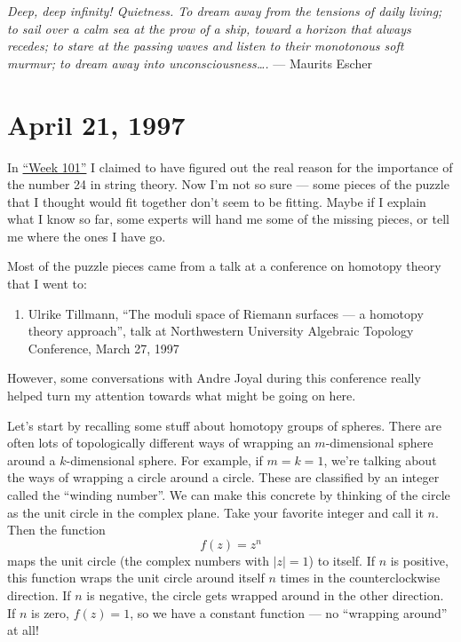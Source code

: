\documentclass{article}
\def\tightlist{}
\begin{document}
\emph{Deep, deep infinity! Quietness. To dream away from the tensions of
daily living; to sail over a calm sea at the prow of a ship, toward a
horizon that always recedes; to stare at the passing waves and listen to
their monotonous soft murmur; to dream away into unconsciousness\ldots.}
--- Maurits Escher
\hypertarget{week102}{%
\section{April 21, 1997}\label{week102}}

In \protect\hyperlink{week101}{``Week 101''} I claimed to have figured
out the real reason for the importance of the number 24 in string
theory. Now I'm not so sure --- some pieces of the puzzle that I thought
would fit together don't seem to be fitting. Maybe if I explain what I
know so far, some experts will hand me some of the missing pieces, or
tell me where the ones I have go.

Most of the puzzle pieces came from a talk at a conference on homotopy
theory that I went to:

\begin{enumerate}
\def\labelenumi{\arabic{enumi})}
\tightlist
\item
  Ulrike Tillmann, ``The moduli space of Riemann surfaces --- a homotopy
  theory approach'', talk at Northwestern University Algebraic Topology
  Conference, March 27, 1997
\end{enumerate}

However, some conversations with Andre Joyal during this conference
really helped turn my attention towards what might be going on here.

Let's start by recalling some stuff about homotopy groups of spheres.
There are often lots of topologically different ways of wrapping an
\(m\)-dimensional sphere around a \(k\)-dimensional sphere. For example,
if \(m = k = 1\), we're talking about the ways of wrapping a circle
around a circle. These are classified by an integer called the ``winding
number''. We can make this concrete by thinking of the circle as the
unit circle in the complex plane. Take your favorite integer and call it
\(n\). Then the function \[f(z) = z^n\] maps the unit circle (the
complex numbers with \(|z| = 1\)) to itself. If \(n\) is positive, this
function wraps the unit circle around itself \(n\) times in the
counterclockwise direction. If \(n\) is negative, the circle gets
wrapped around in the other direction. If \(n\) is zero, \(f(z) = 1\),
so we have a constant function --- no ``wrapping around'' at all!
\end{document}
